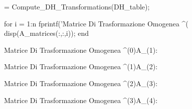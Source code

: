 \documentclass[11pt, a4paper]{article}
\begin{document}
\begin{matlabcode}
 = Compute_DH_Transformations(DH_table);

for i = 1:n
    fprintf('Matrice Di Trasformazione Omogenea ^(%
    disp(A_matrices(:,:,i));
end
\end{matlabcode}
\begin{matlaboutput}
Matrice Di Trasformazione Omogenea ^(0)A_(1):
\end{matlaboutput}
\begin{matlaboutput}
Matrice Di Trasformazione Omogenea ^(1)A_(2):
\end{matlaboutput}
\begin{matlaboutput}
Matrice Di Trasformazione Omogenea ^(2)A_(3):
\end{matlaboutput}
\begin{matlaboutput}
Matrice Di Trasformazione Omogenea ^(3)A_(4):
\end{matlaboutput}
\end{document}
